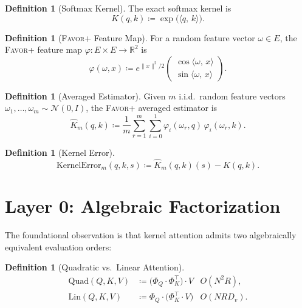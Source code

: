 \documentclass[11pt,a4paper,twocolumn]{article}
\theoremstyle{definition}
\newtheorem{definition}[theorem]{Definition}
\theoremstyle{remark}
\newcommand{\R}{\mathbb{R}}
\newcommand{\favor}{\textsc{Favor+}}
\newcommand{\ip}[2]{\langle #1,\, #2 \rangle}
\begin{document}
\begin{definition}[Softmax Kernel]
\label{def:softmax}
The exact softmax kernel is
\begin{equation}
  K(q, k) \coloneqq \exp\!\bigl(\ip{q}{k}\bigr).
\end{equation}
\end{definition}

\begin{definition}[\favor{} Feature Map]
\label{def:favor}
For a random feature vector $\omega \in E$, the \favor{} feature map
$\varphi : E \times E \to \R^2$ is
\begin{equation}
  \varphi(\omega, x) \coloneqq
  e^{\|x\|^2/2}
  \begin{pmatrix}
    \cos\ip{\omega}{x} \\
    \sin\ip{\omega}{x}
  \end{pmatrix}.
\end{equation}
\end{definition}

\begin{definition}[Averaged Estimator]
\label{def:estimator}
Given $m$ i.i.d.\ random feature vectors
$\omega_1, \ldots, \omega_m \sim \mathcal{N}(0, I)$, the \favor{} averaged
estimator is
\begin{equation}
  \hat{K}_m(q, k)
  \coloneqq
  \frac{1}{m} \sum_{r=1}^{m}
    \sum_{i=0}^{1} \varphi_i(\omega_r, q)\,\varphi_i(\omega_r, k).
\end{equation}
\end{definition}

\begin{definition}[Kernel Error]
\label{def:error}
\begin{equation}
  \mathrm{KernelError}_m(q,k,s)
  \coloneqq \hat{K}_m(q,k)(s) - K(q,k).
\end{equation}
\end{definition}


\section{Layer 0: Algebraic Factorization}
\label{sec:layer0}

The foundational observation is that kernel attention admits two
algebraically equivalent evaluation orders:

\begin{definition}[Quadratic vs.\ Linear Attention]
\begin{align}
  \text{Quad}(Q,K,V) &\coloneqq \bigl(\Phi_Q \cdot \Phi_K^\top\bigr) \cdot V
    & O(N^2 R), \\
  \text{Lin}(Q,K,V) &\coloneqq \Phi_Q \cdot \bigl(\Phi_K^\top \cdot V\bigr)
    & O(N R D_v).
\end{align}
\end{definition}
\end{document}
